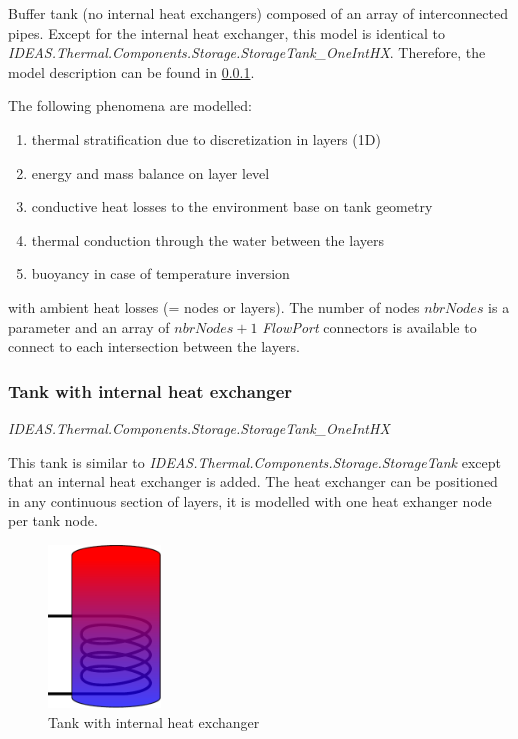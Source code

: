 Buffer tank (no internal heat exchangers) composed of an array of interconnected pipes.  Except for the internal heat exchanger, this model is identical to \emph{IDEAS.Thermal.Components.Storage.StorageTank_OneIntHX}. Therefore, the model description can be found in \ref{sec:tesHX}.

The following phenomena are modelled:

\begin{enumerate}
	\item thermal stratification due to discretization in layers (1D)
	\item energy and mass balance on layer level
	\item conductive heat losses to the environment base on tank geometry
	\item thermal conduction through the water between the layers
	\item buoyancy in case of temperature inversion
	
\end{enumerate}
 
 with ambient heat losses (= nodes or layers).  The number of nodes $nbrNodes$ is a parameter and an array of $nbrNodes + 1$ \emph{FlowPort} connectors is available to connect to each intersection between the layers. 



\subsubsection{Tank with internal heat exchanger}
\label{sec:tesHX}

\emph{IDEAS.Thermal.Components.Storage.StorageTank_OneIntHX}

\vspace{6mm}

This tank is similar to \emph{IDEAS.Thermal.Components.Storage.StorageTank} except that an internal heat exchanger is added.  The heat exchanger can be positioned in any continuous section of layers, it is modelled with one heat exhanger node per tank node. 

\begin{figure}%
\begin{left}
\includegraphics[width=3cm]{Thermal/images/HydraulicScheme.pdf}%
\caption{Tank with internal heat exchanger}%
\label{tankinternal}%
\end{left}
\end{figure}




